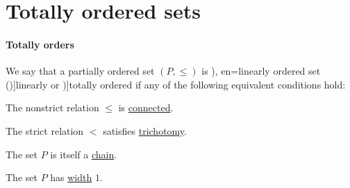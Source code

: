 \section{Totally ordered sets}\label{sec:totally_ordered_sets}

\paragraph{Totally orders}

\begin{definition}\label{def:totally_ordered_set}
  We say that a partially ordered set \( (P, \leq) \) is \term[ru=линейно упорядоченое множество (\cite[def. 3.4]{Гуров2013ТеорияРешёток}), en=linearly ordered set (\cite[def. 1.3.1]{Harzheim2005OrderedSets})]{linearly} or \term[en=totally ordered set (\cite[def. 1.3]{DaveyPriestley2002LatticeTheory})]{totally ordered} if any of the following equivalent conditions hold:
  \begin{thmenum}
     The nonstrict relation \( \leq \) is \hyperref[def:binary_relation/connected]{connected}.

     The strict relation \( < \) satisfies \hyperref[def:binary_relation/trichotomy]{trichotomy}.

     The set \( P \) is itself a \hyperref[def:partial_order_connectedness/chain]{chain}.

    \mimprovised The set \( P \) has \hyperref[def:partial_order_connectedness/width]{width} \( 1 \).
  \end{thmenum}
\end{definition}
